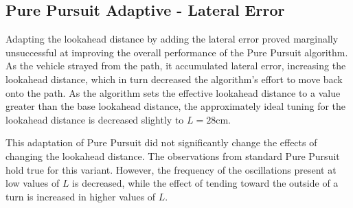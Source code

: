 \documentclass[12pt]{article}
\begin{document}
\begin{flushleft}
\begin{figure}[H]
\endminipage
\end{figure}

\subsection{Pure Pursuit Adaptive - Lateral Error}

Adapting the lookahead distance by adding the lateral error proved marginally unsuccessful at improving the overall performance of the Pure Pursuit algorithm. As the vehicle strayed from the path, it accumulated lateral error, increasing the lookahead distance, which in turn decreased the algorithm's effort to move back onto the path. As the algorithm sets the effective lookahead distance to a value greater than the base lookahead distance, the approximately ideal tuning for the lookahead distance is decreased slightly to $L=28$cm.

This adaptation of Pure Pursuit did not significantly change the effects of changing the lookahead distance. The observations from standard Pure Pursuit hold true for this variant. However, the frequency of the oscillations present at low values of $L$ is decreased, while the effect of tending toward the outside of a turn is increased in higher values of $L$.


\end{flushleft}
\end{document}
